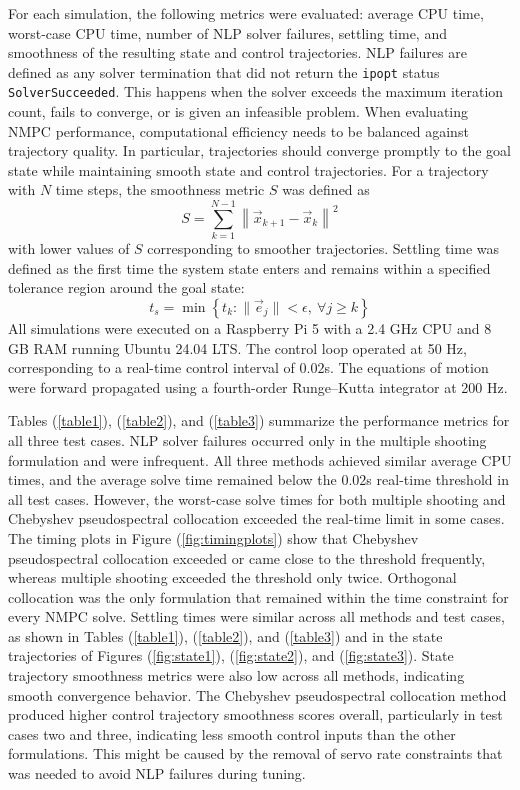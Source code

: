 \documentclass[conf]{new-aiaa}
\begin{document}
	For each simulation, the following metrics were evaluated: average CPU time, worst-case CPU time, number of NLP solver failures, settling time, and smoothness of the resulting state and control trajectories.
	NLP failures are defined as any solver termination that did not return the \texttt{ipopt} status \texttt{SolverSucceeded}. This happens when the solver exceeds the maximum iteration count, fails to converge, or is given an infeasible problem.
	When evaluating NMPC performance, computational efficiency needs to be balanced against trajectory quality. In particular, trajectories should converge promptly to the goal state while maintaining smooth state and control trajectories. 
	For a trajectory with $N$ time steps, the smoothness metric $S$ was defined as
\[
S
=
\sum_{k=1}^{N-1}
\left\|
\vec{x}_{k+1} - \vec{x}_k
\right\|^2
\]
	with lower values of $S$ corresponding to smoother trajectories.
	Settling time was defined as the first time the system state enters and remains within a specified tolerance region around the goal state:
\[
t_s
=
\min \left\{
t_k :
\|\vec{e}_j\| < \epsilon,
\ \forall j \ge k
\right\}
\]
	All simulations were executed on a Raspberry Pi 5 with a 2.4 GHz CPU and 8 GB RAM running Ubuntu 24.04 LTS. The control loop operated at 50 Hz, corresponding to a real-time control interval of $0.02$s. The equations of motion were forward propagated using a fourth-order Runge--Kutta integrator at 200 Hz.

	Tables (\ref{table1}), (\ref{table2}), and (\ref{table3}) summarize the performance metrics for all three test cases. NLP solver failures occurred only in the multiple shooting formulation and were infrequent.
	All three methods achieved similar average CPU times, and the average solve time remained below the $0.02$s real-time threshold in all test cases. However, the worst-case solve times for both multiple shooting and Chebyshev pseudospectral collocation exceeded the real-time limit in some cases. The timing plots in Figure (\ref{fig:timingplots}) show that Chebyshev pseudospectral collocation exceeded or came close to the threshold frequently, whereas multiple shooting exceeded the threshold only twice. Orthogonal collocation was the only formulation that remained within the time constraint for every NMPC solve.
	Settling times were similar across all methods and test cases, as shown in Tables (\ref{table1}), (\ref{table2}), and (\ref{table3}) and in the state trajectories of Figures (\ref{fig:state1}), (\ref{fig:state2}), and (\ref{fig:state3}). State trajectory smoothness metrics were also low across all methods, indicating smooth convergence behavior.
	The Chebyshev pseudospectral collocation method produced higher control trajectory smoothness scores overall, particularly in test cases two and three, indicating less smooth control inputs than the other formulations. This might be caused by the removal of servo rate constraints that was needed to avoid NLP failures during tuning.
\end{document}
